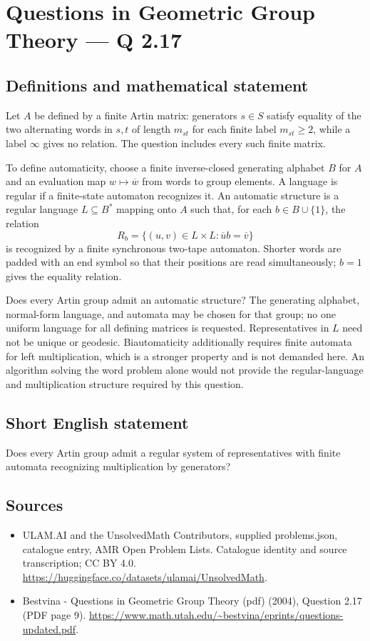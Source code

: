 \documentclass[11pt,a4paper]{article}
\begin{document}
\section*{Questions in Geometric Group Theory — Q 2.17}\label{statement}

\subsection{Definitions and mathematical statement}
Let $A$ be defined by a finite Artin matrix: generators $s\in S$ satisfy equality of the two alternating words in $s,t$ of length $m_{st}$ for each finite label $m_{st}\geq2$, while a label $\infty$ gives no relation. The question includes every such finite matrix.

To define automaticity, choose a finite inverse-closed generating alphabet $B$ for $A$ and an evaluation map $w\mapsto\overline w$ from words to group elements. A language is regular if a finite-state automaton recognizes it. An automatic structure is a regular language $L\subseteq B^*$ mapping onto $A$ such that, for each $b\in B\cup\{1\}$, the relation
\[
 R_b=\{(u,v)\in L\times L:\overline u b=\overline v\}
\]
is recognized by a finite synchronous two-tape automaton. Shorter words are padded with an end symbol so that their positions are read simultaneously; $b=1$ gives the equality relation.

Does every Artin group admit an automatic structure? The generating alphabet, normal-form language, and automata may be chosen for that group; no one uniform language for all defining matrices is requested. Representatives in $L$ need not be unique or geodesic. Biautomaticity additionally requires finite automata for left multiplication, which is a stronger property and is not demanded here. An algorithm solving the word problem alone would not provide the regular-language and multiplication structure required by this question.
\subsection{Short English statement}
Does every Artin group admit a regular system of representatives with finite automata recognizing multiplication by generators?
\subsection{Sources}
\begin{itemize}
\item[S1] ULAM.AI and the UnsolvedMath Contributors, supplied problems.json, catalogue entry, AMR Open Problem Lists. Catalogue identity and source transcription; CC BY 4.0.
\url{https://huggingface.co/datasets/ulamai/UnsolvedMath}.
\item[S2] Bestvina - Questions in Geometric Group Theory (pdf) (2004), Question 2.17 (PDF page 9). 
\url{https://www.math.utah.edu/~bestvina/eprints/questions-updated.pdf}.
\end{itemize}
\end{document}

